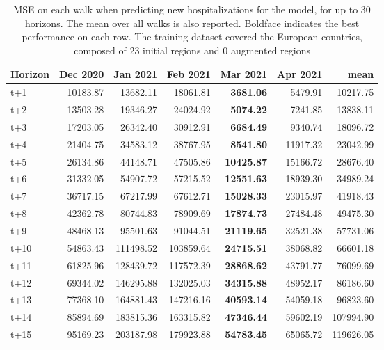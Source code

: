 \begin{table}[H]
\centering
\caption{MSE on each walk when predicting new hospitalizations for the model, for up to 30 horizons. The mean over all walks is also reported. Boldface indicates the best performance on each row. The training dataset covered the European countries, composed of 23 initial regions and 0 augmented regions }
\label{tab:MSE_walk_custom_linear_regression}
\begin{tabular}{lrrrrrr}
\toprule
Horizon &  Dec 2020 &  Jan 2021 &  Feb 2021 &  Mar 2021 &  Apr 2021 &      mean \\
\midrule
t+1  & 10183.87  & 13682.11  & 18061.81  & \textbf{3681.06}  & 5479.91  & 10217.75  \\
t+2  & 13503.28  & 19346.27  & 24024.92  & \textbf{5074.22}  & 7241.85  & 13838.11  \\
t+3  & 17203.05  & 26342.40  & 30912.91  & \textbf{6684.49}  & 9340.74  & 18096.72  \\
t+4  & 21404.75  & 34583.12  & 38767.95  & \textbf{8541.80}  & 11917.32  & 23042.99  \\
t+5  & 26134.86  & 44148.71  & 47505.86  & \textbf{10425.87}  & 15166.72  & 28676.40  \\
t+6  & 31332.05  & 54907.72  & 57215.52  & \textbf{12551.63}  & 18939.30  & 34989.24  \\
t+7  & 36717.15  & 67217.99  & 67612.71  & \textbf{15028.33}  & 23015.97  & 41918.43  \\
t+8  & 42362.78  & 80744.83  & 78909.69  & \textbf{17874.73}  & 27484.48  & 49475.30  \\
t+9  & 48468.13  & 95501.63  & 91044.51  & \textbf{21119.65}  & 32521.38  & 57731.06  \\
t+10  & 54863.43  & 111498.52  & 103859.64  & \textbf{24715.51}  & 38068.82  & 66601.18  \\
t+11  & 61825.96  & 128439.72  & 117572.39  & \textbf{28868.62}  & 43791.77  & 76099.69  \\
t+12  & 69344.02  & 146295.88  & 132025.03  & \textbf{34315.88}  & 48952.17  & 86186.60  \\
t+13  & 77368.10  & 164881.43  & 147216.16  & \textbf{40593.14}  & 54059.18  & 96823.60  \\
t+14  & 85894.69  & 183815.36  & 163315.82  & \textbf{47346.44}  & 59602.19  & 107994.90  \\
t+15  & 95169.23  & 203187.98  & 179923.88  & \textbf{54783.45}  & 65065.72  & 119626.05  \\

\end{tabular}
\end{table}
